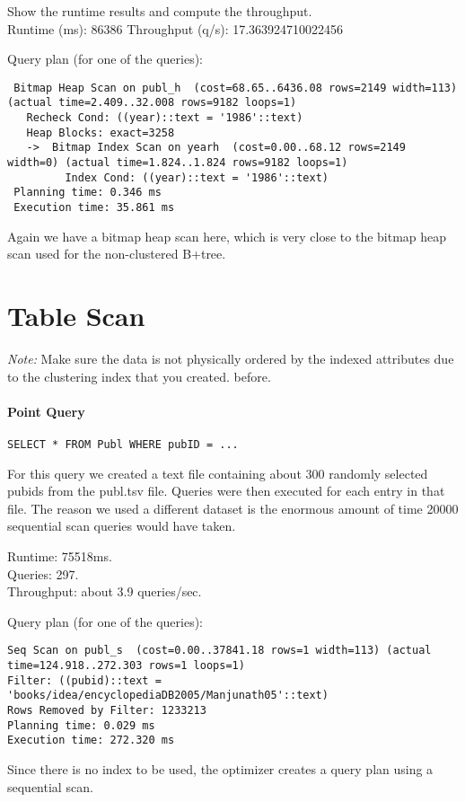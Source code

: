 \documentclass[11pt]{scrartcl}
\begin{document}
\smallskip\noindent
Show the runtime results and compute the throughput.\\
Runtime (ms): 86386
Throughput (q/s): 17.363924710022456

\smallskip\noindent
Query plan (for one of the queries):
{\small
\begin{verbatim}
 Bitmap Heap Scan on publ_h  (cost=68.65..6436.08 rows=2149 width=113) (actual time=2.409..32.008 rows=9182 loops=1)
   Recheck Cond: ((year)::text = '1986'::text)
   Heap Blocks: exact=3258
   ->  Bitmap Index Scan on yearh  (cost=0.00..68.12 rows=2149 width=0) (actual time=1.824..1.824 rows=9182 loops=1)
         Index Cond: ((year)::text = '1986'::text)
 Planning time: 0.346 ms
 Execution time: 35.861 ms
\end{verbatim}
}
Again we have a bitmap heap scan here, which is very close to the bitmap heap scan used for the non-clustered B+tree.

\section{Table Scan}

\noindent \emph{Note:} Make sure the data is not physically ordered by
the indexed attributes due to the clustering index that you created.
before.

\paragraph{Point Query}

{\small
\begin{verbatim}
SELECT * FROM Publ WHERE pubID = ...
\end{verbatim}
}

\noindent
For this query we created a text file containing about 300 randomly selected pubids from the publ.tsv file. Queries were then executed for each entry in that file. The reason we used a different dataset is the enormous amount of time 20000 sequential scan queries would have taken.

\smallskip\noindent
Runtime: 75518ms.\\
Queries: 297.\\
Throughput: about 3.9 queries/sec.

\smallskip\noindent
Query plan (for one of the queries):
{\small
\begin{verbatim}
Seq Scan on publ_s  (cost=0.00..37841.18 rows=1 width=113) (actual time=124.918..272.303 rows=1 loops=1)
Filter: ((pubid)::text = 'books/idea/encyclopediaDB2005/Manjunath05'::text)
Rows Removed by Filter: 1233213
Planning time: 0.029 ms
Execution time: 272.320 ms
\end{verbatim}
Since there is no index to be used, the optimizer creates a query plan using a sequential scan.
}
\end{document}
